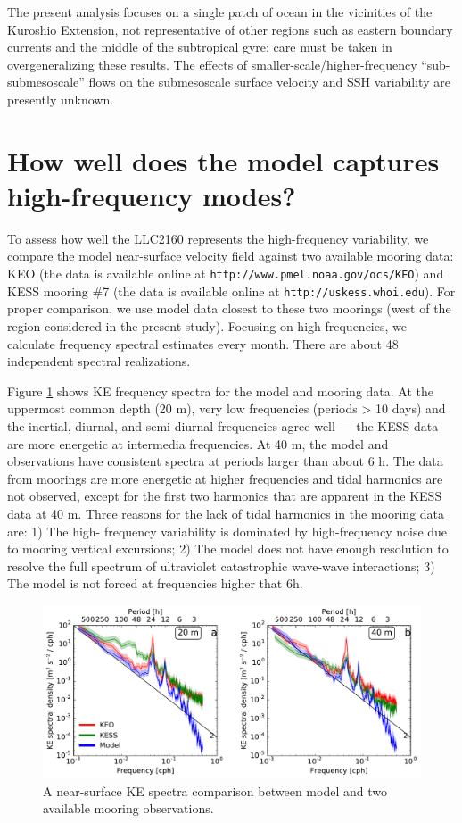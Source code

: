 \documentclass[grl]{agutex2015}
\begin{document}
\begin{article}
The present analysis focuses on a single patch of ocean in the
vicinities of the Kuroshio Extension, not
representative of other regions such as eastern boundary currents
and the middle of the subtropical gyre: care must be taken in overgeneralizing
these results.  The effects of smaller-scale/higher-frequency
``sub-submesoscale'' flows on the submesoscale surface velocity and SSH variability
are presently unknown.

\appendix
\section{How well does the model captures high-frequency modes?}
To assess how well the LLC2160 represents the high-frequency variability,
we compare the model near-surface velocity field against two available
mooring data: KEO (the data is available online at \texttt{http://www.pmel.noaa.gov/ocs/KEO})
and KESS mooring $\#$7 (the data is available online at \texttt{http://uskess.whoi.edu}).
For proper comparison, we use model data closest to these two moorings (west of
the region considered in the present study). Focusing on high-frequencies, we
calculate frequency spectral estimates every month. There are about 48 independent
spectral realizations.

Figure \ref{figA1} shows KE frequency spectra for the model and mooring data.
At the uppermost common depth (20 m), very low frequencies (periods > 10 days)
and the inertial, diurnal, and semi-diurnal frequencies agree well --- the KESS
data are more energetic at intermedia frequencies. At 40 m, the model and observations
have consistent spectra at periods larger than about 6 h. The data from moorings
are more energetic at higher frequencies and tidal harmonics are not observed,
except for the first two harmonics that are apparent in the KESS data at 40 m.
Three reasons for the lack of tidal harmonics in the mooring data are: 1) The high-
frequency variability is dominated by high-frequency noise due to mooring vertical
excursions; 2) The model does not have enough resolution to resolve the full spectrum
of ultraviolet catastrophic wave-wave interactions; 3) The model is not forced at
frequencies higher that 6h.

\begin{figure}[ht]
   \begin{center}
     \includegraphics[width=.9\textwidth]{figs/figA1.pdf}
  \caption{A near-surface KE spectra comparison between model and two
  available mooring observations.}
  \label{figA1}
  \end{center}
\end{figure}


\end{article}
\end{document}
